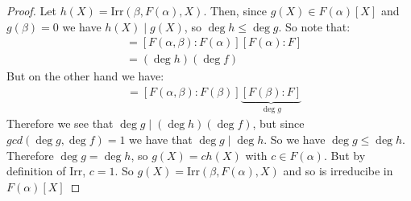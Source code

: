 \begin{exercise}
\begin{proof}
Let $h(X) = \text{Irr}(\beta,F(\alpha),X)$. Then, since $g(X)\in F(\alpha)[X]$ and $g(\beta) = 0$ we have $h(X)\mid g(X)$, so $\deg h\leq \deg g$. So note that:\begin{align*}
    [F(\alpha,\beta)\colon F] &= [F(\alpha,\beta)\colon F(\alpha)][F(\alpha)\colon F]\\
                              &= (\deg h)(\deg f)
\end{align*}
But on the other hand we have:\begin{align*}
    [F(\alpha,\beta)\colon F] &= [F(\alpha,\beta)\colon F(\beta)]\underbrace{[F(\beta)\colon F]}_{\deg g}
\end{align*}
Therefore we see that $\deg g \mid (\deg h)(\deg f)$, but since $gcd(\deg g, \deg f) = 1$ we have that $\deg g\mid \deg h$. So we have $\deg g \leq \deg h$. Therefore $\deg g = \deg h$, so $g(X) = ch(X)$ with $c\in F(\alpha)$. But by definition of $\text{Irr}$, $c = 1$. So $g(X) = \text{Irr}(\beta,F(\alpha),X)$ and so is irreducibe in $F(\alpha)[X]$
\end{proof}
\end{exercise}
